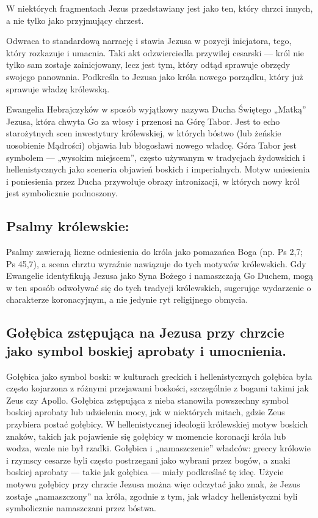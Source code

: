 W niektórych fragmentach Jezus przedstawiany jest jako ten, który chrzci innych, a nie tylko jako przyjmujący chrzest.

Odwraca to standardową narrację i stawia Jezusa w pozycji inicjatora, tego, który rozkazuje i umacnia.
Taki akt odzwierciedla przywilej cesarski — król nie tylko sam zostaje zainicjowany, lecz jest tym, który odtąd sprawuje obrzędy swojego panowania.
Podkreśla to Jezusa jako króla nowego porządku, który już sprawuje władzę królewską.

Ewangelia Hebrajczyków w sposób wyjątkowy nazywa Ducha Świętego „Matką” Jezusa, która chwyta Go za włosy i przenosi na Górę Tabor.
Jest to echo starożytnych scen inwestytury królewskiej, w których bóstwo (lub żeńskie uosobienie Mądrości) objawia lub błogosławi nowego władcę.
Góra Tabor jest symbolem — „wysokim miejscem”, często używanym w tradycjach żydowskich i hellenistycznych jako sceneria objawień boskich i imperialnych.
Motyw uniesienia i poniesienia przez Ducha przywołuje obrazy intronizacji, w których nowy król jest symbolicznie podnoszony.

\subsection{Psalmy królewskie:}\label{par:royal-psalms}

Psalmy zawierają liczne odniesienia do króla jako pomazańca Boga (np. Ps 2,7; Ps 45,7), a scena chrztu wyraźnie nawiązuje do tych motywów królewskich.
Gdy Ewangelie identyfikują Jezusa jako Syna Bożego i namaszczają Go Duchem, mogą w ten sposób odwoływać się do tych tradycji królewskich, sugerując wydarzenie o charakterze koronacyjnym, a nie jedynie ryt religijnego obmycia.

\subsection{Gołębica zstępująca na Jezusa przy chrzcie jako symbol boskiej aprobaty i umocnienia.}\label{subsec:the-dove-descending-on-jesus-at-his-baptism-is-a-symbol-of-divine-approval-and-empowerment.}

Gołębica jako symbol boski: w kulturach greckich i hellenistycznych gołębica była często kojarzona z różnymi przejawami boskości, szczególnie z bogami takimi jak Zeus czy Apollo.
Gołębica zstępująca z nieba stanowiła powszechny symbol boskiej aprobaty lub udzielenia mocy, jak w niektórych mitach, gdzie Zeus przybiera postać gołębicy.
W hellenistycznej ideologii królewskiej motyw boskich znaków, takich jak pojawienie się gołębicy w momencie koronacji króla lub wodza, wcale nie był rzadki.
Gołębica i „namaszczenie” władców: greccy królowie i rzymscy cesarze byli często postrzegani jako wybrani przez bogów, a znaki boskiej aprobaty — takie jak gołębica — miały podkreślać tę ideę.
Użycie motywu gołębicy przy chrzcie Jezusa można więc odczytać jako znak, że Jezus zostaje „namaszczony” na króla, zgodnie z tym, jak władcy hellenistyczni byli symbolicznie namaszczani przez bóstwa.

